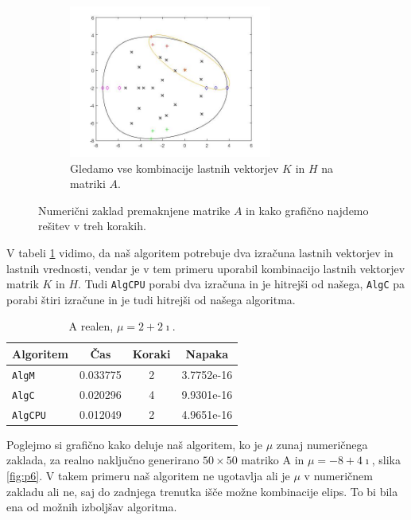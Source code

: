 \documentclass[12pt,a4paper]{amsart}
\theoremstyle{definition}
\theoremstyle{plain}
\begin{document}
\begin{figure}[H]
\begin{subfigure}[t]{0.45\textwidth}
\label{fig:p53}
\end{subfigure}%
\hfill
\begin{subfigure}[t]{0.45\textwidth}
\includegraphics[width=0.9\linewidth,height=5cm]{RC3e3.jpg}
\caption{Gledamo vse kombinacije lastnih vektorjev $K$ in $H$ na matriki $A$.\footnotemark[\value{footnote}]}
\label{fig:p53}
\end{subfigure}
\caption{Numerični zaklad premaknjene matrike $A$ in kako grafično najdemo rešitev v treh korakih.}
\end{figure}
V tabeli \ref{t5} vidimo, da naš algoritem potrebuje dva izračuna lastnih vektorjev in lastnih vrednosti, vendar je v tem primeru uporabil kombinacijo lastnih vektorjev matrik $K$ in $H$. 
Tudi \verb+AlgCPU+ porabi dva izračuna in je hitrejši od našega, \verb+AlgC+ pa porabi štiri izračune in je tudi hitrejši od našega algoritma.
\begin{table}[H]
\caption{A realen, $\mu = 2 + 2\imath$.}
\begin{tabular}{|l|c|c|c|}
\hline
Algoritem & Čas & Koraki & Napaka\\
\hline
\hline
\verb+AlgM+ &0.033775&2&3.7752e-16\\
\hline
\verb+AlgC+ &0.020296 &4 & 9.9301e-16\\
\hline
\verb+AlgCPU+ &0.012049&2&4.9651e-16 \\
\hline
\end{tabular}

\label{t5}
\end{table}
Poglejmo si grafično kako deluje naš algoritem, ko je $\mu$ zunaj numeričnega zaklada, za realno naključno generirano $50\times 50$ matriko A in $\mu = -8+4\imath$, slika \ref{fig:p6}. 
V takem primeru naš algoritem ne ugotavlja ali je $\mu$ v numeričnem zakladu ali ne, saj do zadnjega trenutka išče možne kombinacije elips. To bi bila ena od možnih izboljšav algoritma.
\end{document}
